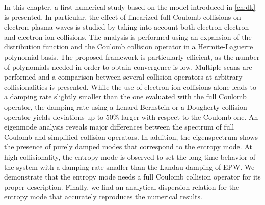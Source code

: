 In this chapter, a first numerical study based on the model introduced in \cref{ch:dk} is presented.
%
In particular, the effect of linearized full Coulomb collisions on electron-plasma waves is studied by taking into account both electron-electron and electron-ion collisions.
%
The analysis is performed using an expansion of the distribution function and the Coulomb collision operator in a Hermite-Laguerre polynomial basis.
%
The proposed framework is particularly efficient, as the number of polynomials needed in order to obtain convergence is low.
%
Multiple scans are performed and a comparison between several collision operators at arbitrary collisionalities is presented.
%
While the use of electron-ion collisions {alone} leads to a damping rate slightly smaller than the one evaluated with the full Coulomb operator, the damping rate using a Lenard-Bernstein or a Dougherty collision operator yields deviations up to 50\% larger with respect to the Coulomb one.
%
An eigenmode analysis reveals major differences between the spectrum of full Coulomb and simplified collision operators.
%
In addition, the eigenspectrum shows the presence of purely damped modes that correspond to the entropy mode.
%
{At high collisionality, the entropy mode is observed to set the long time behavior of the system with a damping rate smaller than the Landau damping of EPW.}
%
We demonstrate that the entropy mode needs a full Coulomb collision operator for its proper description.
%
Finally, we find an analytical dispersion relation for the entropy mode that accurately reproduces the numerical results.

